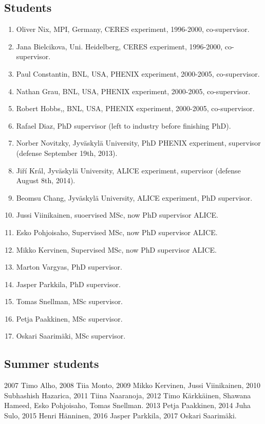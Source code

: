 \documentclass[12pt]{article}
\begin{document}
\subsection{Students}
\begin{enumerate}
\item Oliver Nix, MPI, Germany, CERES experiment, 1996-2000, co-supervisor.
\item Jana Bielcikova, Uni. Heidelberg, CERES experiment, 1996-2000, co-supervisor.
\item Paul Constantin, BNL, USA, PHENIX experiment, 2000-2005, co-supervisor.
\item Nathan Grau, BNL, USA, PHENIX experiment, 2000-2005, co-supervisor.
\item Robert Hobbs,, BNL, USA, PHENIX experiment, 2000-2005, co-supervisor.
\item Rafael Diaz, PhD supervisor (left to industry before finishing PhD).
\item Norber Novitzky, Jyv\"askyl\"a University, PhD PHENIX experiment, supervisor (defense September 19th, 2013).
\item Ji\v{r}\'i Kr\'al, Jyv\"askyl\"a University, ALICE experiment, supervisor  (defense August 8th, 2014).
\item Beomsu Chang, Jyv\"askyl\"a University, ALICE experiment, PhD supervisor.
\item Jussi Viinikainen, suoervised MSc, now PhD supervisor ALICE.
\item Esko Pohjoisaho, Supervised MSc, now PhD supervisor ALICE.
\item Mikko Kervinen, Supervised MSc, now PhD supervisor ALICE.
\item Marton Vargyas, PhD supervisor.
\item Jasper Parkkila, PhD supervisor.
\item Tomas Snellman, MSc supervisor.
\item Petja Paakkinen, MSc supervisor.
\item Oskari Saarim\"aki, MSc supervisor.
\end{enumerate}

\subsection{Summer students}
2007 Timo Alho, 2008 Tiia Monto, 2009 Mikko Kervinen, Jussi Viinikainen, 2010 Subhashish Hazarica, 2011 Tiina Naaranoja, 2012	 Timo K\"arkk\"ainen, Shawana Hameed, Esko Pohjoisaho, Tomas Snellman. 2013 Petja Paakkinen,
2014 Juha Sulo, 2015 Henri H\"anninen, 2016 Jasper Parkkila,
2017 Oskari Saarim\"aki.
\end{document}
